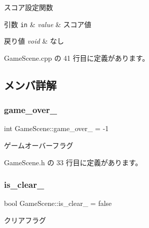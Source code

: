 スコア設定関数 


\begin{DoxyParams}[1]{引数}
\mbox{\tt in}  & {\em value} & スコア値 \\
\hline
\end{DoxyParams}

\begin{DoxyRetVals}{戻り値}
{\em void} & なし \\
\hline
\end{DoxyRetVals}


 Game\+Scene.\+cpp の 41 行目に定義があります。



\subsection{メンバ詳解}
\mbox{\label{class_game_scene_a92b5476dc1536c43b604bef51cc36c70}} 
\subsubsection{\texorpdfstring{game\+\_\+over\+\_\+}{game\_over\_}}
{\footnotesize\ttfamily int Game\+Scene\+::game\+\_\+over\+\_\+ = -\/1\hspace{0.3cm}{\ttfamily [private]}}



ゲームオーバーフラグ 



 Game\+Scene.\+h の 33 行目に定義があります。

\mbox{\label{class_game_scene_a48cf67b81c80718df80ee03aa6e73e74}} 
\subsubsection{\texorpdfstring{is\+\_\+clear\+\_\+}{is\_clear\_}}
{\footnotesize\ttfamily bool Game\+Scene\+::is\+\_\+clear\+\_\+ = false\hspace{0.3cm}{\ttfamily [private]}}



クリアフラグ 



